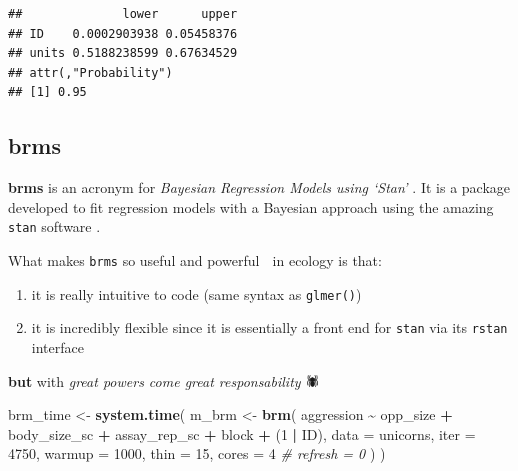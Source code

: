 \documentclass[
  12pt,
]{book}
\newenvironment{Shaded}{\begin{snugshade}}{\end{snugshade}}
\newcommand{\CommentTok}[1]{\textcolor[rgb]{0.56,0.35,0.01}{\textit{#1}}}
\newcommand{\DataTypeTok}[1]{\textcolor[rgb]{0.13,0.29,0.53}{#1}}
\newcommand{\DecValTok}[1]{\textcolor[rgb]{0.00,0.00,0.81}{#1}}
\newcommand{\KeywordTok}[1]{\textcolor[rgb]{0.13,0.29,0.53}{\textbf{#1}}}
\newcommand{\NormalTok}[1]{#1}
\newcommand{\OperatorTok}[1]{\textcolor[rgb]{0.81,0.36,0.00}{\textbf{#1}}}
\newcommand{\StringTok}[1]{\textcolor[rgb]{0.31,0.60,0.02}{#1}}
\providecommand{\tightlist}{%
  \setlength{\itemsep}{0pt}\setlength{\parskip}{0pt}}
\begin{document}
\begin{verbatim}
##              lower      upper
## ID    0.0002903938 0.05458376
## units 0.5188238599 0.67634529
## attr(,"Probability")
## [1] 0.95
\end{verbatim}

\hypertarget{brms}{%
\subsection{brms}\label{brms}}

\textbf{brms} is an acronym for \emph{Bayesian Regression Models using `Stan'} \citep{R-brms}. It is a package developed to fit regression models with a Bayesian approach using the amazing \texttt{stan} software \citep{stan2021}.

What makes \texttt{brms} so useful and powerful 💪 in ecology is that:

\begin{enumerate}
\def\labelenumi{\arabic{enumi}.}
\tightlist
\item
  it is really intuitive to code (same syntax as \texttt{glmer()})
\item
  it is incredibly flexible since it is essentially a front end for \texttt{stan} via its \texttt{rstan} interface \citep{R-rstan}
\end{enumerate}

\textbf{but} with \emph{great powers come great responsability} 🕷

\begin{Shaded}
\begin{Highlighting}[]
\NormalTok{brm\_time \textless{}{-}}\StringTok{ }\KeywordTok{system.time}\NormalTok{(}
\NormalTok{  m\_brm \textless{}{-}}\StringTok{ }\KeywordTok{brm}\NormalTok{(}
\NormalTok{    aggression }\OperatorTok{\textasciitilde{}}\StringTok{ }\NormalTok{opp\_size }\OperatorTok{+}\StringTok{ }\NormalTok{body\_size\_sc }\OperatorTok{+}\StringTok{ }\NormalTok{assay\_rep\_sc }\OperatorTok{+}\StringTok{ }\NormalTok{block}
      \OperatorTok{+}\StringTok{ }\NormalTok{(}\DecValTok{1} \OperatorTok{|}\StringTok{ }\NormalTok{ID),}
    \DataTypeTok{data =}\NormalTok{ unicorns, }\DataTypeTok{iter =} \DecValTok{4750}\NormalTok{, }\DataTypeTok{warmup =} \DecValTok{1000}\NormalTok{, }\DataTypeTok{thin =} \DecValTok{15}\NormalTok{, }\DataTypeTok{cores =} \DecValTok{4}
    \CommentTok{\# refresh = 0}
\NormalTok{  )}
\NormalTok{)}
\end{Highlighting}
\end{Shaded}
\end{document}
